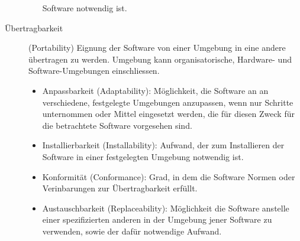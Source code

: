 \begin{description}
\begin{itemize}
  Software notwendig ist.
  \end{itemize}
\ifslides
\newpage
\fi
\item[Übertragbarkeit] (Portability) Eignung der Software von einer Umgebung
  in eine andere über\-tra\-gen zu werden. Umgebung kann organisatorische,
  Hardware- und Software-Um\-geb\-ungen einschliessen.
  \begin{itemize}
  \item Anpassbarkeit (Adaptability): Möglichkeit, die Software an an
  verschiedene, festgelegte Umgebungen anzupassen, wenn nur Schritte
  unternommen oder Mittel eingesetzt werden, die für diesen Zweck für die
  betrachtete Software vorgesehen sind.
  \item Installierbarkeit (Installability): Aufwand, der zum Installieren der
  Software in einer festgelegten Umgebung notwendig ist.
  \item Konformität (Conformance): Grad, in dem die Software Normen oder
  Verinbarungen zur Übertragbarkeit erfüllt.
  \item Austauschbarkeit (Replaceability): Möglichkeit die Software anstelle
  einer spezifizierten anderen in der Umgebung jener Software zu verwenden,
  sowie der dafür notwendige Aufwand.
  \end{itemize}
\end{description}
